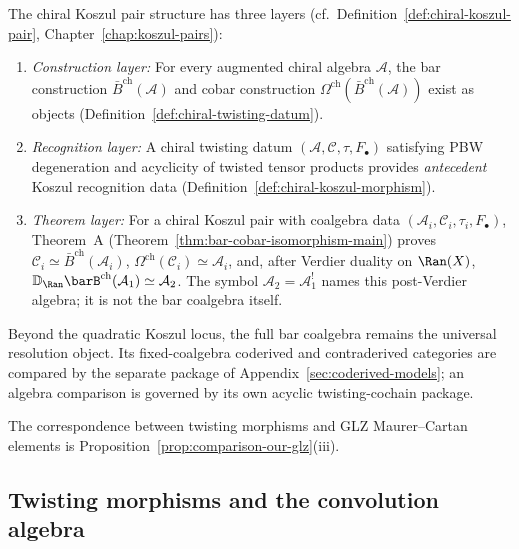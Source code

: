 The chiral Koszul pair structure has three layers
(cf.\ Definition~\ref{def:chiral-koszul-pair},
Chapter~\ref{chap:koszul-pairs}):
\begin{enumerate}[label=\textup{(\roman*)}]
\item \emph{Construction layer:} For every augmented chiral algebra
 $\mathcal{A}$, the bar construction
 $\bar{B}^{\mathrm{ch}}(\mathcal{A})$ and cobar construction
 $\Omega^{\mathrm{ch}}(\bar{B}^{\mathrm{ch}}(\mathcal{A}))$ exist as
 objects (Definition~\ref{def:chiral-twisting-datum}).

\item \emph{Recognition layer:} A chiral twisting datum
 $(\mathcal{A}, \mathcal{C}, \tau, F_\bullet)$ satisfying PBW
 degeneration and acyclicity of twisted tensor products
 provides \emph{antecedent} Koszul recognition data
 (Definition~\ref{def:chiral-koszul-morphism}).

\item \emph{Theorem layer:} For a chiral Koszul pair with
 coalgebra data $(\mathcal{A}_i,\mathcal{C}_i,\tau_i,F_\bullet)$,
 Theorem~A
 (Theorem~\ref{thm:bar-cobar-isomorphism-main}) proves
 $\mathcal{C}_i \simeq \bar{B}^{\mathrm{ch}}(\mathcal{A}_i)$,
 $\Omega^{\mathrm{ch}}(\mathcal{C}_i) \simeq \mathcal{A}_i$,
 and, after Verdier duality on $\Ran(X)$,
 $\mathbb{D}_{\Ran}\barB^{\mathrm{ch}}(\mathcal{A}_1)
 \simeq \mathcal{A}_2$.
 The symbol $\mathcal{A}_2=\mathcal{A}_1^!$ names this
 post-Verdier algebra; it is not the bar coalgebra itself.
\end{enumerate}
Beyond the quadratic Koszul locus, the full bar coalgebra remains the
universal resolution object. Its fixed-coalgebra coderived and
contraderived categories are compared by the separate package of
Appendix~\ref{sec:coderived-models}; an algebra comparison is governed
by its own acyclic twisting-cochain package.%

The correspondence between twisting morphisms and GLZ Maurer--Cartan
elements is Proposition~\ref{prop:comparison-our-glz}(iii).%

\subsection{Twisting morphisms and the convolution algebra}
\label{subsec:twisting-morphisms-fundamental}

